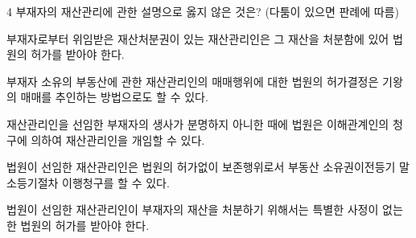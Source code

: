 \begin{question}{4}
부재자의 재산관리에 관한 설명으로 옳지 않은 것은? (다툼이 있으면 판례에 따름)
\begin{choices}
  \item 부재자로부터 위임받은 재산처분권이 있는 재산관리인은 그 재산을 처분함에 있어 법원의 허가를 받아야 한다.
  \item 부재자 소유의 부동산에 관한 재산관리인의 매매행위에 대한 법원의 허가결정은 기왕의 매매를 추인하는 방법으로도 할 수 있다.
  \item 재산관리인을 선임한 부재자의 생사가 분명하지 아니한 때에 법원은 이해관계인의 청구에 의하여 재산관리인을 개임할 수 있다.
  \item 법원이 선임한 재산관리인은 법원의 허가없이 보존행위로서 부동산 소유권이전등기 말소등기절차 이행청구를 할 수 있다.
  \item 법원이 선임한 재산관리인이 부재자의 재산을 처분하기 위해서는 특별한 사정이 없는 한 법원의 허가를 받아야 한다.
\end{choices}
\end{question}
